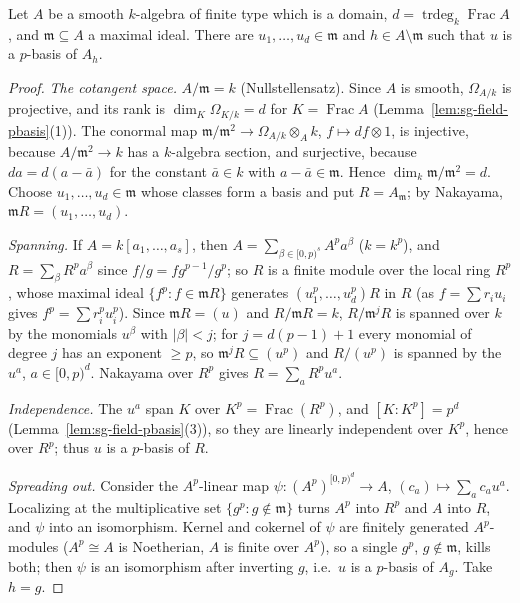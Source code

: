 \begin{lemma}\label{lem:sg-kunz}
\leanok
{}
Let $A$ be a smooth $k$-algebra of finite type which is a domain, $d=\operatorname{trdeg}_k\operatorname{Frac}A$, and $\mathfrak m\subseteq A$ a maximal ideal. There are
$u_1,\dots,u_d\in\mathfrak m$ and $h\in A\setminus\mathfrak m$ such that $u$ is a $p$-basis of $A_h$.
\end{lemma}

\begin{proof}
\emph{The cotangent space.} $A/\mathfrak m=k$ (Nullstellensatz). Since $A$ is smooth, $\Omega_{A/k}$ is projective, and its rank is
$\dim_K\Omega_{K/k}=d$ for $K=\operatorname{Frac}A$ (Lemma~\ref{lem:sg-field-pbasis}(1)). The conormal map $\mathfrak m/\mathfrak m^2\to\Omega_{A/k}\otimes_Ak$,
$f\mapsto df\otimes1$, is injective, because $A/\mathfrak m^2\to k$ has a $k$-algebra section, and surjective, because $da=d(a-\bar a)$ for the
constant $\bar a\in k$ with $a-\bar a\in\mathfrak m$. Hence $\dim_k\mathfrak m/\mathfrak m^2=d$. Choose $u_1,\dots,u_d\in\mathfrak m$ whose classes form a basis and put
$R=A_{\mathfrak m}$; by Nakayama, $\mathfrak mR=(u_1,\dots,u_d)$.

\emph{Spanning.} If $A=k[a_1,\dots,a_s]$, then $A=\sum_{\beta\in[0,p)^s}A^pa^\beta$ ($k=k^p$), and $R=\sum_\beta R^pa^\beta$ since $f/g=fg^{p-1}/g^p$; so
$R$ is a finite module over the local ring $R^p$, whose maximal ideal $\{f^p:f\in\mathfrak mR\}$ generates $(u_1^p,\dots,u_d^p)R$ in $R$ (as
$f=\sum r_iu_i$ gives $f^p=\sum r_i^pu_i^p$). Since $\mathfrak mR=(u)$ and $R/\mathfrak mR=k$, $R/\mathfrak m^jR$ is spanned over $k$ by the monomials $u^\beta$
with $|\beta|<j$; for $j=d(p-1)+1$ every monomial of degree $j$ has an exponent $\ge p$, so $\mathfrak m^jR\subseteq(u^p)$ and $R/(u^p)$ is spanned by
the $u^a$, $a\in[0,p)^d$. Nakayama over $R^p$ gives $R=\sum_aR^pu^a$.

\emph{Independence.} The $u^a$ span $K$ over $K^p=\operatorname{Frac}(R^p)$, and $[K:K^p]=p^d$ (Lemma~\ref{lem:sg-field-pbasis}(3)), so they are linearly
independent over $K^p$, hence over $R^p$; thus $u$ is a $p$-basis of $R$.

\emph{Spreading out.} Consider the $A^p$-linear map $\psi\colon(A^p)^{[0,p)^d}\to A$, $(c_a)\mapsto\sum_ac_au^a$. Localizing at the multiplicative set
$\{g^p:g\notin\mathfrak m\}$ turns $A^p$ into $R^p$ and $A$ into $R$, and $\psi$ into an isomorphism. Kernel and cokernel of $\psi$ are finitely
generated $A^p$-modules ($A^p\cong A$ is Noetherian, $A$ is finite over $A^p$), so a single $g^p$, $g\notin\mathfrak m$, kills both; then $\psi$ is an
isomorphism after inverting $g$, i.e.\ $u$ is a $p$-basis of $A_g$. Take $h=g$.
\end{proof}

